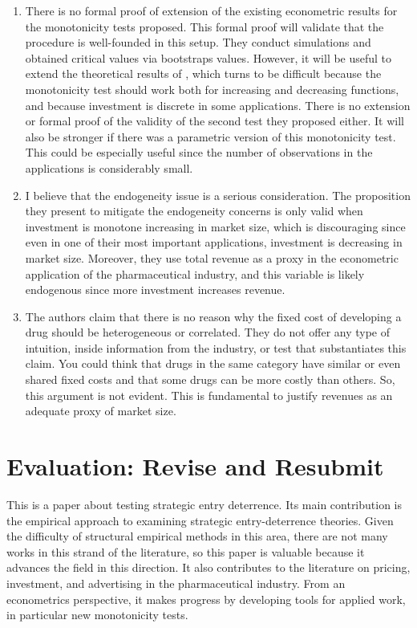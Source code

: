 \documentclass{article}
\theoremstyle{definition}
\begin{document}
\begin{enumerate}
    \item There is no formal proof of extension of the existing econometric results for the monotonicity tests proposed. This formal proof will validate that the procedure is well-founded in this setup. They conduct simulations and obtained critical values via bootstraps values. However, it will be useful to extend the theoretical results of \cite{hall2000testing}, which turns to be difficult because the monotonicity test should work both for increasing and decreasing functions, and because investment is discrete in some applications. There is no extension or formal proof of the validity of the second test they proposed either. It will also be stronger if there was a parametric version of this monotonicity test. This could be especially useful since the number of observations in the applications is considerably small. 
    
    \item I believe that the endogeneity issue is a serious consideration. The proposition they present to mitigate the endogeneity concerns is only valid when investment is monotone increasing in market size, which is discouraging since even in one of their most important applications, investment is decreasing in market size. Moreover, they use total revenue as a proxy in the econometric application of the pharmaceutical industry, and this variable is likely endogenous since more investment increases revenue. 
    
    \item The authors claim that there is no reason why the fixed cost of developing a drug should be heterogeneous or correlated. They do not offer any type of intuition, inside information from the industry, or test that substantiates this claim. You could think that drugs in the same category have similar or even shared fixed costs and that some drugs can be more costly than others. So, this argument is not evident. This is fundamental to justify revenues as an adequate proxy of market size.
\end{enumerate}

\section*{Evaluation: Revise and Resubmit}
This is a paper about testing strategic entry deterrence. Its main contribution is the empirical approach to examining strategic entry-deterrence theories. Given the difficulty of structural empirical methods in this area, there are not many works in this strand of the literature, so this paper is valuable because it advances the field in this direction. It also contributes to the literature on pricing, investment, and advertising in the pharmaceutical industry. From an econometrics perspective, it makes progress by developing tools for applied work, in particular new monotonicity tests. 
\end{document}
